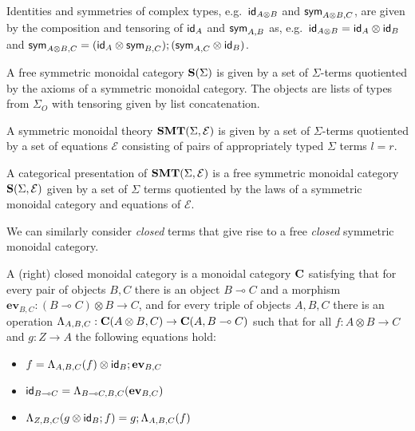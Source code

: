 Identities and symmetries of complex types, e.g.\ $\textsf{id}_{A \otimes B}$ and $\textsf{sym}_{A \otimes B, C}$, are given by the composition and tensoring of $\textsf{id}_{A}$ and $\textsf{sym}_{A,B}$ as, e.g.\ $\textsf{id}_{A \otimes B} = \textsf{id}_{A} \otimes \textsf{id}_{B}$ and $\textsf{sym}_{A \otimes B, C} = (\textsf{id}_{A} \otimes \textsf{sym}_{B,C});(\textsf{sym}_{A,C} \otimes \textsf{id}_{B})$.

\begin{definition}
	A free symmetric monoidal category $\mathbf{S}(\Sigma)$ is given by a set of $\Sigma$-terms quotiented by the axioms of a symmetric monoidal category.
	The objects are lists of types from $\Sigma_{O}$ with tensoring given by list concatenation.
\end{definition}

\begin{definition}
	A symmetric monoidal theory $\mathbf{SMT}(\Sigma, \mathcal{E})$ is given by a set of $\Sigma$-terms quotiented by a set of equations $\mathcal{E}$ consisting of pairs of appropriately typed $\Sigma$ terms $l = r$.
\end{definition}

\begin{definition}
	A categorical presentation of  $\mathbf{SMT}(\Sigma, \mathcal{E})$ is a free symmetric monoidal category $\mathbf{S}(\Sigma, \mathcal{E})$ given by a set of $\Sigma$ terms quotiented by the laws of a symmetric monoidal category and equations of $\mathcal{E}$.
\end{definition}

We can similarly consider \emph{closed} terms that give rise to a free \emph{closed} symmetric monoidal category.

\begin{definition}%
	\label{def:closed}
	A (right) closed monoidal category is a monoidal category $\mathbf{C}$ satisfying that for
	every pair of objects $B,C$ there is an object $B \multimap C$ and a morphism $\textbf{ev}_{B,C} : (B \multimap C) \otimes B \to
		C$, and for every triple of objects $A,B,C$ there is an operation $\Lambda_{A,B,C} : \mathbf{C}(A \otimes B,C) \to
		\mathbf{C}(A,B \multimap{} C)$ such that for all $f : A \otimes B \to C$ and $g : Z \to A$ the following equations hold:
	\begin{itemize}
		\item $f = \Lambda_{A,B,C}(f) \otimes \textsf{id}_{B}; \textbf{ev}_{B,C}$
		\item $\textsf{id}_{B \multimap{} C} = \Lambda_{B \multimap{} C,B,C}(\textbf{ev}_{B,C})$
		\item $\Lambda_{Z,B,C}(g \otimes \textsf{id}_{B}; f) = g;\Lambda_{A,B,C}(f)$
	\end{itemize}
\end{definition}

